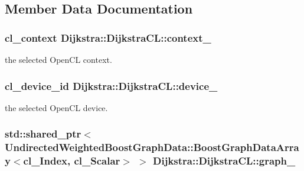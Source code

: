 \subsection{Member Data Documentation}
\hypertarget{class_dijkstra_1_1_dijkstra_c_l_a53f966d6cc79d454cbc48e11467662b4}{
\subsubsection[{context\+\_\+}]{\setlength{\rightskip}{0pt plus 5cm}cl\+\_\+context Dijkstra\+::\+Dijkstra\+C\+L\+::context\+\_\+\hspace{0.3cm}{\ttfamily [private]}}}\label{class_dijkstra_1_1_dijkstra_c_l_a53f966d6cc79d454cbc48e11467662b4}


the selected Open\+C\+L context. 

\hypertarget{class_dijkstra_1_1_dijkstra_c_l_ac848f9681e88c61e339ab6d70bcfacdf}{
\subsubsection[{device\+\_\+}]{\setlength{\rightskip}{0pt plus 5cm}cl\+\_\+device\+\_\+id Dijkstra\+::\+Dijkstra\+C\+L\+::device\+\_\+\hspace{0.3cm}{\ttfamily [private]}}}\label{class_dijkstra_1_1_dijkstra_c_l_ac848f9681e88c61e339ab6d70bcfacdf}


the selected Open\+C\+L device. 

\hypertarget{class_dijkstra_1_1_dijkstra_c_l_a0b851e99d9aed1cc0671fc537efe3a20}{
\subsubsection[{graph\+\_\+}]{\setlength{\rightskip}{0pt plus 5cm}std\+::shared\+\_\+ptr$<${\bf Undirected\+Weighted\+BoostGraphData\+::\+BoostGraphData\+Array}$<${\bf cl\+\_\+\+Index}, {\bf cl\+\_\+\+Scalar}$>$ $>$ Dijkstra\+::\+Dijkstra\+C\+L\+::graph\+\_\+\hspace{0.3cm}{\ttfamily [private]}}}\label{class_dijkstra_1_1_dijkstra_c_l_a0b851e99d9aed1cc0671fc537efe3a20}



